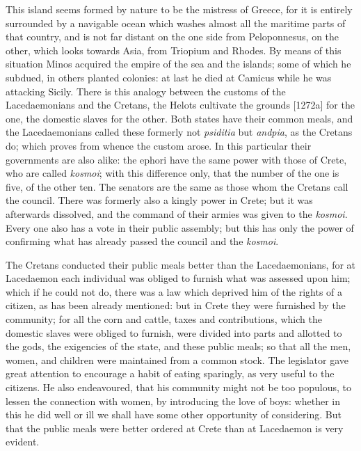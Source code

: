 This island seems formed by nature to be the mistress of Greece, for it is
entirely surrounded by a navigable ocean which washes almost all the
maritime parts of that country, and is not far distant on the one side
from Peloponnesus, on the other, which looks towards Asia, from Triopium
and Rhodes. By means of this situation Minos acquired the empire of the
sea and the islands; some of which he subdued, in others planted colonies:
at last he died at Camicus while he was attacking Sicily. There is this
analogy between the customs of the Lacedaemonians and the Cretans, the
Helots cultivate the grounds [1272a] for the one, the domestic slaves for
the other. Both states have their common meals, and the Lacedaemonians
called these formerly not \emph{psiditia} but \emph{andpia}, as the
Cretans do; which proves from whence the custom arose. In this particular
their governments are also alike: the ephori have the same power with
those of Crete, who are called \emph{kosmoi}; with this difference only,
that the number of the one is five, of the other ten. The senators are the
same as those whom the Cretans call the council. There was formerly also a
kingly power in Crete; but it was afterwards dissolved, and the command of
their armies was given to the \emph{kosmoi}. Every one also has a vote in
their public assembly; but this has only the power of confirming what has
already passed the council and the \emph{kosmoi}.

The Cretans conducted their public meals better than the Lacedaemonians,
for at Lacedaemon each individual was obliged to furnish what was assessed
upon him; which if he could not do, there was a law which deprived him of
the rights of a citizen, as has been already mentioned: but in Crete they
were furnished by the community; for all the corn and cattle, taxes and
contributions, which the domestic slaves were obliged to furnish, were
divided into parts and allotted to the gods, the exigencies of the state,
and these public meals; so that all the men, women, and children were
maintained from a common stock. The legislator gave great attention to
encourage a habit of eating sparingly, as very useful to the citizens. He
also endeavoured, that his community might not be too populous, to lessen
the connection with women, by introducing the love of boys: whether in this
he did well or ill we shall have some other opportunity of considering.
But that the public meals were better ordered at Crete than at Lacedaemon
is very evident.

